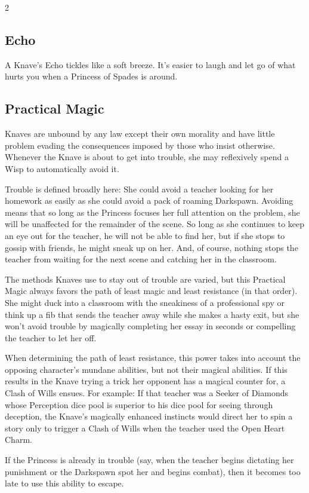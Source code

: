 \begin{multicols}{2}
\subsection*{Echo}

A Knave's Echo tickles like a soft breeze. It's easier to laugh and let go of what hurts you when a Princess of Spades is around. 

\subsection*{Practical Magic}

Knaves are unbound by any law except their own morality and have little problem evading the consequences imposed by those who insist otherwise. Whenever the Knave is about to get into trouble, she may reflexively spend a Wisp to automatically avoid it. 

Trouble is defined broadly here: She could avoid a teacher looking for her homework as easily as she could avoid a pack of roaming Darkspawn. Avoiding means that so long as the Princess focuses her full attention on the problem, she will be unaffected for the remainder of the scene. So long as she continues to keep an eye out for the teacher, he will not be able to find her, but if she stops to gossip with friends, he might sneak up on her. And, of course, nothing stops the teacher from waiting for the next scene and catching her in the classroom.

The methods Knaves use to stay out of trouble are varied, but this Practical Magic always favors the path of least magic and least resistance (in that order). She might duck into a classroom with the sneakiness of a professional spy or think up a fib that sends the teacher away while she makes a hasty exit, but she won't avoid trouble by magically completing her essay in seconds or compelling the teacher to let her off. 

When determining the path of least resistance, this power takes into account the opposing character's mundane abilities, but not their magical abilities. If this results in the Knave trying a trick her opponent has a magical counter for, a Clash of Wills ensues. For example: If that teacher was a Seeker of Diamonds whose Perception dice pool is superior to his dice pool for seeing through deception, the Knave's magically enhanced instincts would direct her to spin a story only to trigger a Clash of Wills when the teacher used the Open Heart Charm.

If the Princess is already in trouble (say, when the teacher begins dictating her punishment or the Darkspawn spot her and begins combat), then it becomes too late to use this ability to escape.


\end{multicols}
